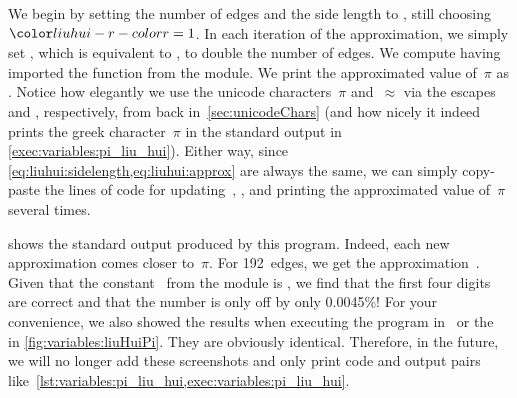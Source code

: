 We begin by setting the number of edges  and the side length to , still choosing~$\liuhuir=1$.
In each iteration of the approximation, we simply set \pythonIdx{*=}, which is equivalent to , to double the number of edges.
We compute  having imported the  function from the  module.
We print the approximated value of~$\pi$ as .
Notice how elegantly we use the unicode characters~$\pi$ and~$\approx$ via the escapes~ and , respectively, from back in~\cref{sec:unicodeChars} (and how nicely it indeed prints the greek character~$\pi$ in the standard output in \cref{exec:variables:pi_liu_hui}).
Either way, since \cref{eq:liuhui:sidelength,eq:liuhui:approx} are always the same, we can simply copy-paste the lines of code for updating~, , and printing the approximated value of~$\pi$ several times.

 shows the standard output produced by this program.
Indeed, each new approximation comes closer to~$\pi$.
For 192~edges, we get the approximation~.
Given that the constant~ from the  module is , we find that the first four digits are correct and that the number is only off by only 0.0045\%!
For your convenience, we also showed the results when executing the program in \pycharm\ or the \ubuntu\  in \cref{fig:variables:liuHuiPi}.
They are obviously identical.
Therefore, in the future, we will no longer add these screenshots and only print code and output pairs like~\cref{lst:variables:pi_liu_hui,exec:variables:pi_liu_hui}.%
%
\endhsection%
%
\FloatBarrier%
\endhsection%
%
